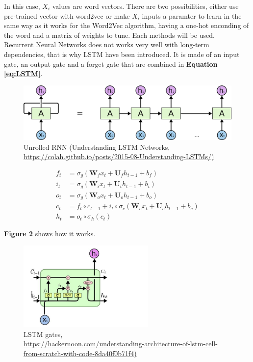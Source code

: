 In this case, $X_i$ values are word vectors. There are two possibilities, either use pre-trained vector with word2vec or make $X_i$ inputs a paramter to learn in the same way as it works for the Word2Vec algorithm, having a one-hot enconding of the word and a matrix of weights to tune. Each methods will be used. \\

Recurrent Neural Networks does not works very well with long-term dependencies, that is why LSTM have been introduced. It is made of an input gate, an output gate and a forget gate that are combined in \textbf{Equation \ref{eq:LSTM}}.

\begin{figure}
	\centering
	\includegraphics[width=\textwidth]{images/chapitre4/RNN-unrolled.png}
	\caption{Unrolled RNN (Understanding LSTM Networks, \url{https://colah.github.io/posts/2015-08-Understanding-LSTMs/)}}
	\label{fig:chap4:RNN_unroll}
\end{figure} 

\begin{align} \label{eq:LSTM}
	f_t &= \sigma_g(\mathbf{W}_f x_t + \mathbf{U}_fh_{t-1} + b_f)\\
	i_t &= \sigma_g(\mathbf{W}_i x_t + \mathbf{U}_ih_{t-1} + b_i)\\
	o_t &= \sigma_g(\mathbf{W}_o x_t + \mathbf{U}_oh_{t-1} + b_o)\\
	c_t &= f_t \circ c_{t-1} + i_t \circ \sigma_c(\mathbf{W}_cx_t + \mathbf{U}_c h_{t-1} + b_c)\\
	h_t &= o_t \circ \sigma_h (c_t)
\end{align}

\textbf{Figure \ref{fig:chap4:LSTM-gates}} shows how it works.

\begin{figure}
	\centering
	\includegraphics[width=0.6\textwidth]{images/chapitre4/LSTM1.jpeg}
	\caption{LSTM gates, \\ \url{https://hackernoon.com/understanding-architecture-of-lstm-cell-from-scratch-with-code-8da40f0b71f4)}}
	\label{fig:chap4:LSTM-gates}
\end{figure} 

